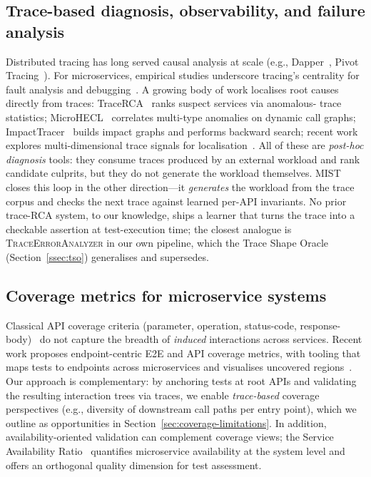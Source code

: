 \documentclass[conference]{IEEEtran}
\begin{document}
\subsection{Trace-based diagnosis, observability, and failure analysis}
Distributed tracing has long served causal analysis at scale (e.g., Dapper~\cite{sigelman2010dapper}, Pivot Tracing~\cite{mace2015pivot}).
For microservices, empirical studies underscore tracing's centrality for fault analysis and debugging~\cite{zhou2018microservice}.
A growing body of work localises root causes directly from traces:
TraceRCA~\cite{li2021tracerca} ranks suspect services via anomalous-
trace statistics; MicroHECL~\cite{liu2021microhecl} correlates
multi-type anomalies on dynamic call graphs;
ImpactTracer~\cite{xie2023impacttracer} builds impact graphs and
performs backward search; recent work explores multi-dimensional trace
signals for localisation~\cite{zhang2024tracecontrast}.  All of these
are \emph{post-hoc diagnosis} tools: they consume traces produced by an
external workload and rank candidate culprits, but they do not generate
the workload themselves.  \textsc{MIST} closes this loop in the other
direction---it \emph{generates} the workload from the trace corpus and
checks the next trace against learned per-API invariants.  No prior
trace-RCA system, to our knowledge, ships a learner that turns the
trace into a checkable assertion at test-execution time; the closest
analogue is \textsc{TraceErrorAnalyzer} in our own pipeline, which the
Trace Shape Oracle (Section~\ref{ssec:tso}) generalises and supersedes.

\subsection{Coverage metrics for microservice systems}
Classical API coverage criteria (parameter, operation, status-code, response-body)~\cite{martin2019restest,arcuri2019restful} do not capture the breadth of \emph{induced} interactions across services. 
Recent work proposes endpoint-centric E2E and API coverage metrics, with tooling that maps tests to endpoints across microservices and visualises uncovered regions~\cite{abdelfattah2024coverage}. 
Our approach is complementary: by anchoring tests at root APIs and validating the resulting interaction trees via traces, we enable \emph{trace-based} coverage perspectives (e.g., diversity of downstream call paths per entry point), which we outline as opportunities in Section~\ref{sec:coverage-limitations}. In addition, availability-oriented validation can complement coverage views; the Service Availability Ratio~\cite{sar} quantifies microservice availability at the system level and offers an orthogonal quality dimension for test assessment.
\end{document}
